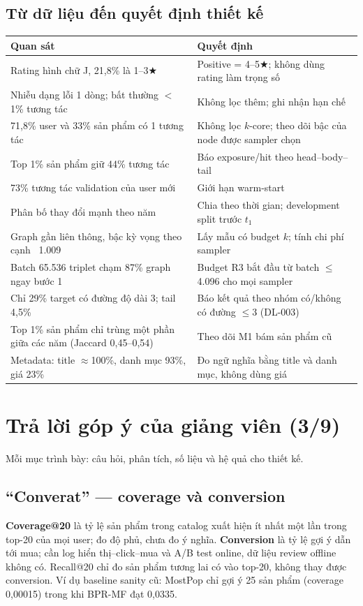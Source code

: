 \documentclass[11pt,a4paper,oneside]{report}
\newcommand{\rstar}{\ensuremath{\bigstar}}
\begin{document}
\section{Từ dữ liệu đến quyết định thiết kế}
\begin{table}[h]
\centering\small
\begin{tabularx}{\linewidth}{YY}
\toprule
Quan sát & Quyết định \\
\midrule
Rating hình chữ J, 21,8\% là 1--3\rstar{} & Positive = 4--5\rstar{}; không dùng rating làm trọng số \\
Nhiễu dạng lỗi 1 dòng; bất thường $<$1\% tương tác & Không lọc thêm; ghi nhận hạn chế \\
71,8\% user và 33\% sản phẩm có 1 tương tác & Không lọc $k$-core; theo dõi bậc của node được sampler chọn \\
Top 1\% sản phẩm giữ 44\% tương tác & Báo exposure/hit theo head--body--tail \\
73\% tương tác validation của user mới & Giới hạn warm-start \\
Phân bố thay đổi mạnh theo năm & Chia theo thời gian; development split trước $t_1$ \\
Graph gần liên thông, bậc kỳ vọng theo cạnh ~1.009 & Lấy mẫu có budget $k$; tính chi phí sampler \\
Batch 65.536 triplet chạm 87\% graph ngay bước 1 & Budget R3 bắt đầu từ batch $\le$4.096 cho mọi sampler \\
Chỉ 29\% target có đường độ dài 3; tail 4,5\% & Báo kết quả theo nhóm có/không có đường $\le$3 (DL-003) \\
Top 1\% sản phẩm chỉ trùng một phần giữa các năm (Jaccard 0,45--0,54) & Theo dõi M1 bám sản phẩm cũ \\
Metadata: title $\approx$100\%, danh mục 93\%, giá 23\% & Đo ngữ nghĩa bằng title và danh mục, không dùng giá \\
\bottomrule
\end{tabularx}
\end{table}

\chapter{Trả lời góp ý của giảng viên (3/9)}\label{ch:feedback}
Mỗi mục trình bày: câu hỏi, phân tích, số liệu và hệ quả cho thiết kế.

\section{``Converat'' — coverage và conversion}
\textbf{Coverage@20} là tỷ lệ sản phẩm trong catalog xuất hiện ít nhất một lần trong top-20 của mọi user; đo độ phủ, chưa đo ý nghĩa. \textbf{Conversion} là tỷ lệ gợi ý dẫn tới mua; cần log hiển thị--click--mua và A/B test online, dữ liệu review offline không có. Recall@20 chỉ đo sản phẩm tương lai có vào top-20, không thay được conversion. Ví dụ baseline sanity cũ: MostPop chỉ gợi ý 25 sản phẩm (coverage 0,00015) trong khi BPR-MF đạt 0,0335.
\end{document}
